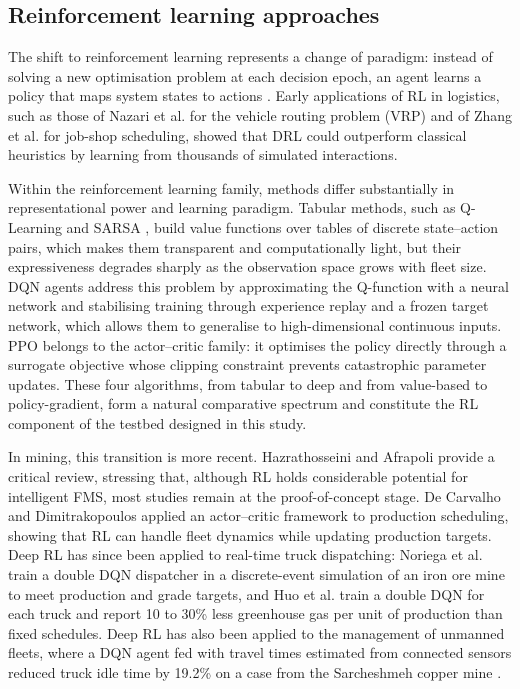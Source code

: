 \documentclass[11pt,a4paper]{article}
\newif\ifrevmarks
\newcommand{\revtag}[1]{\ifrevmarks\textsuperscript{\textcolor{red!70!black}{\scriptsize[#1]}}\fi}
\newcommand{\rev}[2]{\ifrevmarks{\color{revcolor}#2}\revtag{#1}\else#2\fi}
\newif\ifcorrmarks
\newcommand{\corr}[1]{\ifcorrmarks\textcolor{corrcolor}{#1}\else#1\fi}
\begin{document}
\subsection{Reinforcement learning approaches}

The shift to reinforcement learning represents a change of paradigm: instead of solving a new optimisation problem at each decision epoch, an agent learns a policy that maps system states to actions \rev{v3}{\cite{RichardSutton2018}}. Early applications of RL in logistics, such as those of Nazari et al. \cite{MohammadrezaNazari2018} for the vehicle routing problem (VRP) and of Zhang et al. \cite{CongZhang2020} for job-shop scheduling, showed that DRL could outperform classical heuristics by learning from thousands of simulated interactions.

Within the reinforcement learning family, methods differ substantially in representational power and learning paradigm. \rev{m5}{Tabular methods, such as Q-Learning and SARSA \cite{RichardSutton2018},} build value functions over tables of discrete state--action pairs, which makes them transparent and computationally light, but their expressiveness degrades sharply as the observation space grows with fleet size. DQN agents address this problem by approximating the Q-function with a neural network and stabilising training through experience replay and a frozen target network, which allows them to generalise to high-dimensional continuous inputs. PPO \cite{JohnSchulman2017} belongs to the actor--critic family: it optimises the policy directly through a surrogate objective whose clipping constraint prevents catastrophic parameter updates. These four algorithms, from tabular to deep and from value-based to policy-gradient, form a natural comparative spectrum and constitute the RL component of the testbed designed in this study.

In mining, this transition is more recent. Hazrathosseini and Afrapoli \cite{Hazrathosseini2024} provide a critical review, stressing that, although RL holds considerable potential for intelligent FMS, most studies remain at the proof-of-concept stage. De Carvalho and Dimitrakopoulos \cite{deCarvalho2023} applied an actor--critic framework to production scheduling, showing that RL can handle fleet dynamics while updating production targets. \corr{Deep RL has since been applied to real-time truck dispatching: Noriega et al. \cite{Noriega2025} train a double DQN dispatcher in a discrete-event simulation of an iron ore mine to meet production and grade targets, and Huo et al. \cite{Huo2024} train a double DQN for each truck and report 10 to 30\% less greenhouse gas per unit of production than fixed schedules. Deep RL has also been applied to the management of unmanned fleets, where a DQN agent fed with travel times estimated from connected sensors reduced truck idle time by 19.2\% on a case from the Sarcheshmeh copper mine \cite{Badakhshan2025}.}
\end{document}

